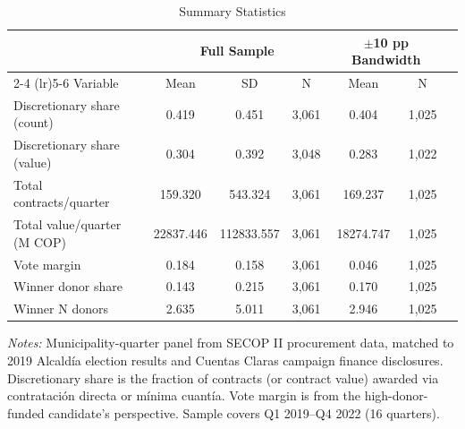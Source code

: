 \begin{table}[t]
\centering
\begin{threeparttable}
\caption{Summary Statistics}
\label{tab:summary}
\begin{tabular}{lcccccc}
\hline\hline
 & \multicolumn{3}{c}{Full Sample} & \multicolumn{2}{c}{$\pm$10 pp Bandwidth} \\
\cmidrule(lr){2-4} \cmidrule(lr){5-6}
Variable & Mean & SD & N & Mean & N \\
\hline
Discretionary share (count) & 0.419 & 0.451 & 3,061 & 0.404 & 1,025 \\
Discretionary share (value) & 0.304 & 0.392 & 3,048 & 0.283 & 1,022 \\
Total contracts/quarter & 159.320 & 543.324 & 3,061 & 169.237 & 1,025 \\
Total value/quarter (M COP) & 22837.446 & 112833.557 & 3,061 & 18274.747 & 1,025 \\
\hline
Vote margin & 0.184 & 0.158 & 3,061 & 0.046 & 1,025 \\
Winner donor share & 0.143 & 0.215 & 3,061 & 0.170 & 1,025 \\
Winner N donors & 2.635 & 5.011 & 3,061 & 2.946 & 1,025 \\
\hline\hline
\end{tabular}
\begin{tablenotes}[flushleft]
\item \textit{Notes:} Municipality-quarter panel from SECOP II procurement data, matched to 2019 Alcald\'{i}a election results and Cuentas Claras campaign finance disclosures. Discretionary share is the fraction of contracts (or contract value) awarded via contrataci\'{o}n directa or m\'{i}nima cuant\'{i}a. Vote margin is from the high-donor-funded candidate's perspective. Sample covers Q1 2019--Q4 2022 (16 quarters).
\end{tablenotes}
\end{threeparttable}
\end{table}

